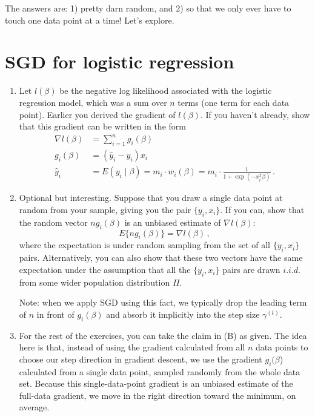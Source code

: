 \documentclass{article}
\begin{document}
The answers are: 1) pretty darn random, and 2) so that we only ever have to touch one data point at a time!  Let's explore.

\newpage
\section{SGD for logistic regression}


\begin{enumerate}[label=(\Alph*)]

\item Let $l(\beta)$ be the negative log likelihood associated with the logistic regression model, which was a sum over $n$ terms (one term for each data point).  Earlier you derived the gradient of $l(\beta)$.  If you haven't already, show that this gradient can be written in the form
$$
\begin{aligned}
\nabla l(\beta) &=  \sum_{i=1}^n g_i(\beta)  \\
g_i(\beta) &= (\hat y_i - y_i) x_i \\
\hat{y}_i &= E(y_i \mid \beta) = m_i \cdot w_i(\beta) = m_i \cdot \frac{1}{1 + \exp(-x_i^T \beta)} \, .
\end{aligned}
$$

\item Optional but interesting.  Suppose that you draw a single data point at random from your sample, giving you the pair $\{y_i, x_i\}$.  If you can, show that the random vector $n g_i(\beta)$ is an unbiased estimate of $\nabla l(\beta)$:
$$
E \{ n g_i(\beta) \} = \nabla l(\beta) \, ,
$$
where the expectation is under random sampling from the set of all $\{y_i, x_i\}$ pairs.  Alternatively, you can also show that these two vectors have the same expectation under the assumption that all the $\{y_i, x_i\}$ pairs are drawn $i.i.d.$ from some wider population distribution $\Pi$.

Note: when we apply SGD using this fact, we typically drop the leading term of $n$ in front of $g_i(\beta)$ and absorb it implicitly into the step size $\gamma^{(t)}$.

\item For the rest of the exercises, you can take the claim in (B) as given.  The idea here is that, instead of using the gradient calculated from all $n$ data points to choose our step direction in gradient descent, we use the gradient $g_i(\beta$) calculated from a single data point, sampled randomly from the whole data set.  Because this single-data-point gradient is an unbiased estimate of the full-data gradient, we move in the right direction toward the minimum, on average.


\end{enumerate}
\end{document}
